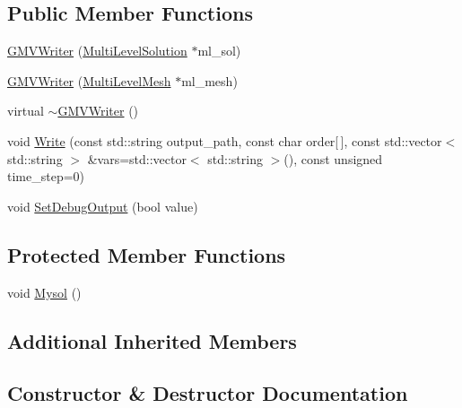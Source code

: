 \subsection*{Public Member Functions}
\begin{DoxyCompactItemize}
\item 
\mbox{\hyperlink{classfemus_1_1_g_m_v_writer_a1fe67dcac973acf1a8e2f2247a996444}{G\+M\+V\+Writer}} (\mbox{\hyperlink{classfemus_1_1_multi_level_solution}{Multi\+Level\+Solution}} $\ast$ml\+\_\+sol)
\item 
\mbox{\hyperlink{classfemus_1_1_g_m_v_writer_a1e320f0b560efd66b7a4450b7c3f055f}{G\+M\+V\+Writer}} (\mbox{\hyperlink{classfemus_1_1_multi_level_mesh}{Multi\+Level\+Mesh}} $\ast$ml\+\_\+mesh)
\item 
virtual \mbox{\hyperlink{classfemus_1_1_g_m_v_writer_afdb81e7c6eb8b793e8615a74a11bb19b}{$\sim$\+G\+M\+V\+Writer}} ()
\item 
void \mbox{\hyperlink{classfemus_1_1_g_m_v_writer_a9f485fb5f1985f07615aed89c18fd254}{Write}} (const std\+::string output\+\_\+path, const char order\mbox{[}$\,$\mbox{]}, const std\+::vector$<$ std\+::string $>$ \&vars=std\+::vector$<$ std\+::string $>$(), const unsigned time\+\_\+step=0)
\item 
void \mbox{\hyperlink{classfemus_1_1_g_m_v_writer_a80134094abcb8d2766414841d86038a9}{Set\+Debug\+Output}} (bool value)
\end{DoxyCompactItemize}
\subsection*{Protected Member Functions}
\begin{DoxyCompactItemize}
\item 
void \mbox{\hyperlink{classfemus_1_1_g_m_v_writer_a836b205f3af6e158b37d10982928c885}{Mysol}} ()
\end{DoxyCompactItemize}
\subsection*{Additional Inherited Members}


\subsection{Constructor \& Destructor Documentation}
\mbox{\label{classfemus_1_1_g_m_v_writer_a1fe67dcac973acf1a8e2f2247a996444}} 
